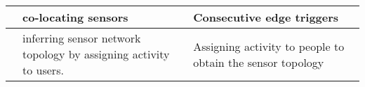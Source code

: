 \begin{table}[!ht]
\begin{tabularx}{\textwidth}{|X|X|X|}
\centering\text{\citeauthor{muller2014automated}}\text{\cite{muller2014automated}}                     & co-locating sensors                                                                                         & Consecutive edge triggers                                                                                                                                                                                                           \\ \hline
\centering\text{\citeauthor{marinakis2005learning}}\text{\cite{marinakis2005learning}}                  & inferring sensor network topology by assigning activity to users. &Assigning activity to people to obtain the sensor topology                                                                                                                                            \\ \hline
\end{tabularx}
\end{table}


